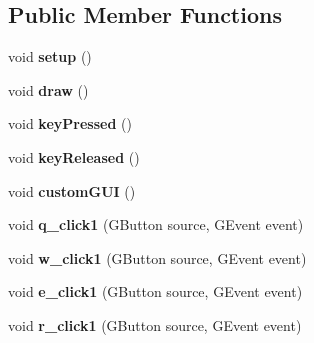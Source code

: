 \subsection*{Public Member Functions}
\begin{DoxyCompactItemize}
\item 
\hypertarget{classkeyplayer__gui_a4f51c3d761204be4bc5ba4f48e806e41}{void {\bfseries setup} ()}\label{classkeyplayer__gui_a4f51c3d761204be4bc5ba4f48e806e41}

\item 
\hypertarget{classkeyplayer__gui_ae66ace1d0588e8896343b325869eb470}{void {\bfseries draw} ()}\label{classkeyplayer__gui_ae66ace1d0588e8896343b325869eb470}

\item 
\hypertarget{classkeyplayer__gui_a11a22f0316258cecae2fd0cca0ffb066}{void {\bfseries key\+Pressed} ()}\label{classkeyplayer__gui_a11a22f0316258cecae2fd0cca0ffb066}

\item 
\hypertarget{classkeyplayer__gui_a4c150bd38043603ea0fb728e613f280d}{void {\bfseries key\+Released} ()}\label{classkeyplayer__gui_a4c150bd38043603ea0fb728e613f280d}

\item 
\hypertarget{classkeyplayer__gui_a2aa16036156f3c1162cbb5ed914b6d0e}{void {\bfseries custom\+G\+U\+I} ()}\label{classkeyplayer__gui_a2aa16036156f3c1162cbb5ed914b6d0e}

\item 
\hypertarget{classkeyplayer__gui_af27ee7b976b3ca3c7904eeaf8997398c}{void {\bfseries q\+\_\+click1} (G\+Button source, G\+Event event)}\label{classkeyplayer__gui_af27ee7b976b3ca3c7904eeaf8997398c}

\item 
\hypertarget{classkeyplayer__gui_a9bd46c0099801f8bf028098851413689}{void {\bfseries w\+\_\+click1} (G\+Button source, G\+Event event)}\label{classkeyplayer__gui_a9bd46c0099801f8bf028098851413689}

\item 
\hypertarget{classkeyplayer__gui_a7841852b38e4abd997b8d3ded6ac20ba}{void {\bfseries e\+\_\+click1} (G\+Button source, G\+Event event)}\label{classkeyplayer__gui_a7841852b38e4abd997b8d3ded6ac20ba}

\item 
\hypertarget{classkeyplayer__gui_af61b8f4a996c76e6cfe90d8a988c0be6}{void {\bfseries r\+\_\+click1} (G\+Button source, G\+Event event)}\label{classkeyplayer__gui_af61b8f4a996c76e6cfe90d8a988c0be6}


\end{DoxyCompactItemize}
